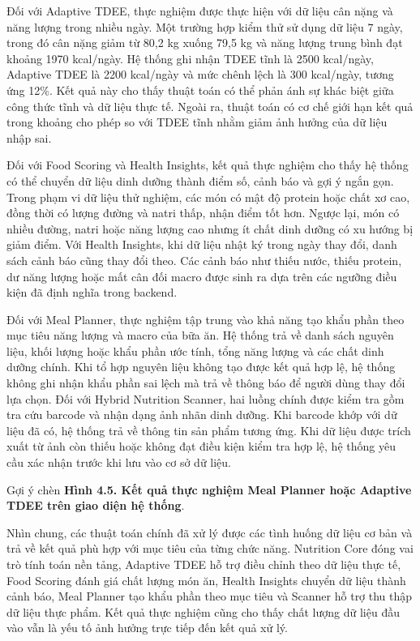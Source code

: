 \documentclass[12pt, a4paper]{report}
\begin{document}
Đối với Adaptive TDEE, thực nghiệm được thực hiện với dữ liệu cân nặng và năng lượng trong nhiều ngày. Một trường hợp kiểm thử sử dụng dữ liệu 7 ngày, trong đó cân nặng giảm từ 80,2 kg xuống 79,5 kg và năng lượng trung bình đạt khoảng 1970 kcal/ngày. Hệ thống ghi nhận TDEE tĩnh là 2500 kcal/ngày, Adaptive TDEE là 2200 kcal/ngày và mức chênh lệch là 300 kcal/ngày, tương ứng 12\%. Kết quả này cho thấy thuật toán có thể phản ánh sự khác biệt giữa công thức tĩnh và dữ liệu thực tế. Ngoài ra, thuật toán có cơ chế giới hạn kết quả trong khoảng cho phép so với TDEE tĩnh nhằm giảm ảnh hưởng của dữ liệu nhập sai.

Đối với Food Scoring và Health Insights, kết quả thực nghiệm cho thấy hệ thống có thể chuyển dữ liệu dinh dưỡng thành điểm số, cảnh báo và gợi ý ngắn gọn. Trong phạm vi dữ liệu thử nghiệm, các món có mật độ protein hoặc chất xơ cao, đồng thời có lượng đường và natri thấp, nhận điểm tốt hơn. Ngược lại, món có nhiều đường, natri hoặc năng lượng cao nhưng ít chất dinh dưỡng có xu hướng bị giảm điểm. Với Health Insights, khi dữ liệu nhật ký trong ngày thay đổi, danh sách cảnh báo cũng thay đổi theo. Các cảnh báo như thiếu nước, thiếu protein, dư năng lượng hoặc mất cân đối macro được sinh ra dựa trên các ngưỡng điều kiện đã định nghĩa trong backend.

Đối với Meal Planner, thực nghiệm tập trung vào khả năng tạo khẩu phần theo mục tiêu năng lượng và macro của bữa ăn. Hệ thống trả về danh sách nguyên liệu, khối lượng hoặc khẩu phần ước tính, tổng năng lượng và các chất dinh dưỡng chính. Khi tổ hợp nguyên liệu không tạo được kết quả hợp lệ, hệ thống không ghi nhận khẩu phần sai lệch mà trả về thông báo để người dùng thay đổi lựa chọn. Đối với Hybrid Nutrition Scanner, hai luồng chính được kiểm tra gồm tra cứu barcode và nhận dạng ảnh nhãn dinh dưỡng. Khi barcode khớp với dữ liệu đã có, hệ thống trả về thông tin sản phẩm tương ứng. Khi dữ liệu được trích xuất từ ảnh còn thiếu hoặc không đạt điều kiện kiểm tra hợp lệ, hệ thống yêu cầu xác nhận trước khi lưu vào cơ sở dữ liệu.

Gợi ý chèn \textbf{Hình 4.5. Kết quả thực nghiệm Meal Planner hoặc Adaptive TDEE trên giao diện hệ thống}.

Nhìn chung, các thuật toán chính đã xử lý được các tình huống dữ liệu cơ bản và trả về kết quả phù hợp với mục tiêu của từng chức năng. Nutrition Core đóng vai trò tính toán nền tảng, Adaptive TDEE hỗ trợ điều chỉnh theo dữ liệu thực tế, Food Scoring đánh giá chất lượng món ăn, Health Insights chuyển dữ liệu thành cảnh báo, Meal Planner tạo khẩu phần theo mục tiêu và Scanner hỗ trợ thu thập dữ liệu thực phẩm. Kết quả thực nghiệm cũng cho thấy chất lượng dữ liệu đầu vào vẫn là yếu tố ảnh hưởng trực tiếp đến kết quả xử lý.
\end{document}
